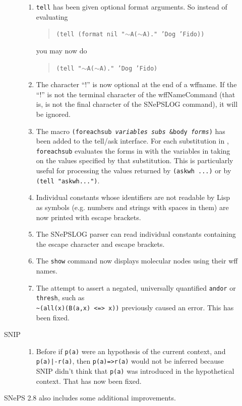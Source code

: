\documentclass{book}
\newcommand{\cv}[1]{{\ttfamily{\itshape #1}}} %
\begin{document}
\begin{description}
\begin{description}
\begin{enumerate}
\item \texttt{tell} has been given optional format arguments.  So instead
     of evaluating
     \begin{quote}
     \texttt{(tell (format nil "\texttt{$\sim$A($\sim$A).}" 'Dog 'Fido))}
     \end{quote}
     you may now do
     \begin{quote}
     \texttt{(tell "\texttt{$\sim$A($\sim$A).}" 'Dog 'Fido)}
     \end{quote}

   \item The character ``!'' is now optional at the end of a wffname.  If the
     ``!''  is not the terminal character of the wffNameCommand (that is, is not
     the final character of the SNePSLOG command), it will be ignored.

   \item The macro \texttt{(foreachsub \textit{variables subs} \&body
       \textit{forms})} has been added to the tell/ask interface.  For each
     substitution in \cv{subs}, \texttt{foreachsub} evaluates the forms in
     \cv{forms} with the variables in \cv{variables} taking on the
     values specified by that substitution.  This is particularly useful for
     processing the values returned by \texttt{(askwh ...)}  or by \texttt{(tell
       "askwh...")}.
   \item Individual constants whose identifiers are not readable by Lisp as
     symbols (e.g. numbers and strings with spaces in them) are now printed with
     escape brackets.
   \item The SNePSLOG parser can read individual constants containing the escape
     character and escape brackets.
   \item The \texttt{show} command now displays molecular nodes using their wff
     names.
   \item The attempt to assert a negated, universally quantified \texttt{andor}
     or \texttt{thresh}, such as\\
     \verb|~|\texttt{(all(x)(B(a,x) <=> x))} previously
     caused an error.  This has been fixed.
    \end{enumerate}

  \item[SNIP]\mbox{}
    \begin{enumerate}
    \item Before if \texttt{p(a)} were an hypothesis of the current context, and
      \texttt{p(a)|-r(a)}, then \texttt{p(a)=>r(a)} would not be inferred
      because SNIP didn't think that \texttt{p(a)} was introduced in the
      hypothetical context.  That has now been fixed.
    \end{enumerate}
  \end{description}
SNePS 2.8 also includes some additional improvements.
\end{description}
\end{document}
